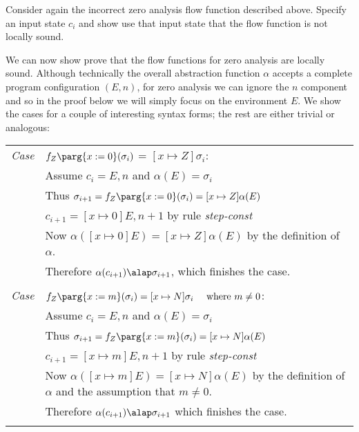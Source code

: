 \documentclass[11pt]{article}
\begin{document}
  Consider again the incorrect zero analysis flow function described above.  Specify an input state $c_i$ and show use that input state that the flow function is not locally sound.


We can now show prove that the flow functions for zero analysis are locally sound.  Although technically the overall abstraction function $\alpha$ accepts a complete program configuration $(E,n)$, for zero analysis we can ignore the $n$ component and so in the proof below we will simply focus on the environment $E$.  We show the cases for a couple of interesting syntax forms; the rest are either trivial or analogous:\\[1ex]

\begin{tabularx}{\textwidth}{lX}
\emph{Case} & $f_Z\parg{x := 0}(\sigma_{i}) $ = $ [x \mapsto Z]\sigma_i$: \\
 & Assume $c_i = E,n$ and $\alpha(E) = \sigma_i$ \\
 & Thus $\sigma_{i+1} = f_Z\parg{x := 0}(\sigma_i) = [x \mapsto Z]\alpha(E)$ \\ 
 & $c_{i+1} = [x \mapsto 0]E,n+1$ by rule \textit{step-const} \\
 & Now $\alpha([x \mapsto 0]E) = [x \mapsto Z]\alpha(E)$ by the definition of $\alpha$. \\

 &Therefore $\alpha(c_{i+1}) \alap \sigma_{i+1}$, which finishes the case.\\

\\
\emph{Case} & $f_Z\parg{x := m}(\sigma_{i}) = [x \mapsto N]\sigma_i ~~~~ \mbox{where}~ m \neq 0$: \\
 & Assume $c_i = E,n$ and $\alpha(E) = \sigma_i$ \\
 & Thus $\sigma_{i+1} = f_Z\parg{x := m}(\sigma_i) = [x \mapsto N]\alpha(E)$ \\
 &  $c_{i+1} = [x \mapsto m]E,n+1$ by rule \textit{step-const} \\ 
 & Now $\alpha([x \mapsto m]E) = [x \mapsto N]\alpha(E)$ by the definition of $\alpha$ and the assumption that $m \neq 0$. \\
 &  Therefore $\alpha(c_{i+1}) \alap \sigma_{i+1}$ which finishes the case.\\

\\


\end{tabularx}
\end{document}
